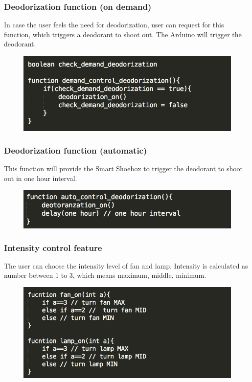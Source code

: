 \documentclass[conference]{IEEEtran}
\begin{document}
\subsubsection{Deodorization function (on demand)}
In case the user feels the need for deodorization, user can request for this function, which triggers a deodorant to shoot out. The Arduino will trigger the deodorant.
\begin{figure}[h]
\begin{center}
    \includegraphics[scale=0.6]{optimization4}
    \label{fig:label}
\end{center}
\end{figure}
\subsubsection{Deodorization function (automatic)}
This function will provide the Smart Shoebox to trigger the deodorant to shoot out in one hour interval. 
\begin{figure}[h]
\begin{center}
    \includegraphics[scale=0.6]{optimization5}
    \label{fig:label}
\end{center}
\end{figure}
\subsubsection{Intensity control feature}
The user can choose the intensity level of fan and lamp. Intensity is calculated as number between 1 to 3, which means maximum, middle, minimum.
\begin{figure}[h]
\begin{center}
    \includegraphics[scale=0.6]{optimization6}
    \label{fig:label}
\end{center}
\end{figure}
\\
\end{document}
